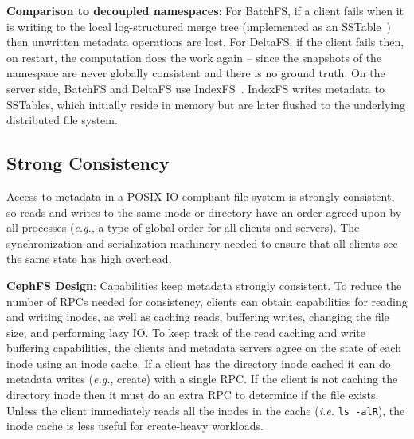 \textbf{Comparison to decoupled namespaces}: For BatchFS, if a client fails
when it is writing to the local log-structured merge tree (implemented as an
SSTable~\cite{ren:atc2013-tablefs}) then unwritten metadata operations are
lost. For DeltaFS, if the client fails then, on restart, the computation does
the work again -- since the snapshots of the namespace are never globally
consistent and there is no ground truth.  On the server side, BatchFS and
DeltaFS use IndexFS~\cite{ren:sc2014-indexfs}. IndexFS writes metadata to
SSTables, which initially reside in memory but are later flushed to the
underlying distributed file system.

\subsection{Strong Consistency}
\label{sec:strong-consistency}

Access to metadata in a POSIX IO-compliant file system is strongly consistent,
so reads and writes to the same inode or directory have an order agreed upon by
all processes ({\it e.g.}, a type of global order for all clients and servers). The
synchronization and serialization machinery needed to ensure that all clients
see the same state has high overhead.


\textbf{CephFS Design}: Capabilities keep metadata strongly consistent. To
reduce the number of RPCs needed for consistency, clients can obtain
capabilities for reading and writing inodes, as well as caching reads,
buffering writes, changing the file size, and performing lazy IO.  To keep
track of the read caching and write buffering capabilities, the clients and
metadata servers agree on the state of each inode using an inode cache.  If a
client has the directory inode cached it can do metadata writes ({\it e.g.},
create) with a single RPC. If the client is not caching the directory inode
then it must do an extra RPC to determine if the file exists.  Unless the
client immediately reads all the inodes in the cache ({\it i.e.} \texttt{ls
-alR}), the inode cache is less useful for create-heavy workloads.


